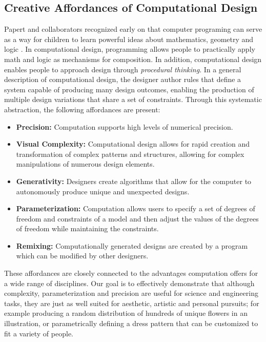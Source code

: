 \documentclass{sigchi}
\begin{document}
\subsection{Creative Affordances of Computational Design}
Papert and collaborators recognized early on that computer programing can serve as a way for children to learn powerful ideas about mathematics, geometry and logic \cite{papert}. In computational design, programming allows people to practically apply math and logic as mechanisms for composition. In addition, computational design enables people to approach design through \textit{procedural thinking}. In a general description of computational design, the designer author rules that define a system capable of producing many design outcomes, enabling the production of multiple design variations that share a set of constraints. Through this systematic abstraction, the following affordances are present\cite{reas}:
\begin{itemize}
\item \textbf{Precision:} Computation supports high levels of numerical precision.
\vspace{-8pt}
\item \textbf{Visual Complexity:} Computational design allows for rapid creation and transformation of complex patterns and structures, allowing for complex manipulations of numerous design elements.
\vspace{-6pt}
\item \textbf{Generativity:} Designers create algorithms that allow for the computer to autonomously produce unique and unexpected designs.
\vspace{-6pt}
\item \textbf{Parameterization:} Computation allows users to specify a set of degrees of freedom and constraints of a model and then adjust the values of the degrees of freedom while maintaining the constraints.
\vspace{-6pt}
\item \textbf{Remixing:} Computationally generated designs are created by a program which can be modified by other designers. 
\end{itemize} 
These affordances are closely connected to the advantages computation offers for a wide range of disciplines. Our goal is to effectively demonstrate that although complexity, parameterization and precision are useful for science and engineering tasks, they are just as well suited for aesthetic, artistic and personal pursuits; for example producing a random distribution of hundreds of unique flowers in an illustration, or parametrically defining a dress pattern that can be customized to fit a variety of people. 
\end{document}
